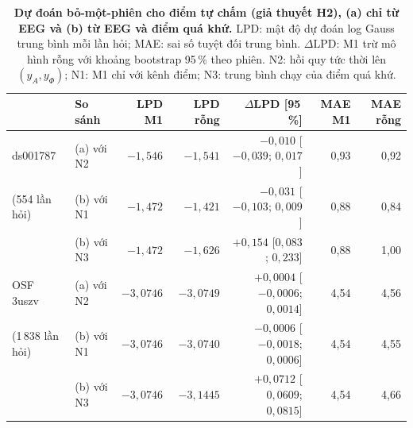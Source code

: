 \begin{table}[t]
\caption{\textbf{Dự đoán bỏ-một-phiên cho điểm tự chấm (giả thuyết H2), (a) chỉ từ EEG và (b) từ EEG và điểm quá khứ.} LPD: mật độ dự đoán log Gauss trung bình mỗi lần hỏi; MAE: sai số tuyệt đối trung bình. \mbox{$\Delta$}LPD: M1 trừ mô hình rỗng với khoảng bootstrap 95\,\% theo phiên. N2: hồi quy tức thời lên $(y_A,y_\Phi)$; N1: M1 chỉ với kênh điểm; N3: trung bình chạy của điểm quá khứ.}
\label{tab:loso}
\centering\footnotesize
\setlength{\tabcolsep}{5pt}
\begin{tabular}{llrrrrr}
\toprule
 & So sánh & LPD M1 & LPD rỗng & $\Delta$LPD [95\,\%] & MAE M1 & MAE rỗng \\
\midrule
ds001787 & (a) với N2 & $-1{,}546$ & $-1{,}541$ & $-0{,}010$ [$-0{,}039$; $0{,}017$] & 0,93 & 0,92 \\
(554 lần hỏi) & (b) với N1 & $-1{,}472$ & $-1{,}421$ & $-0{,}031$ [$-0{,}103$; $0{,}009$] & 0,88 & 0,84 \\
 & (b) với N3 & $-1{,}472$ & $-1{,}626$ & $+0{,}154$ [$0{,}083$; $0{,}233$] & 0,88 & 1,00 \\
\midrule
OSF 3uszv & (a) với N2 & $-3{,}0746$ & $-3{,}0749$ & $+0{,}0004$ [$-0{,}0006$; $0{,}0014$] & 4,54 & 4,56 \\
(1\,838 lần hỏi) & (b) với N1 & $-3{,}0746$ & $-3{,}0740$ & $-0{,}0006$ [$-0{,}0018$; $0{,}0006$] & 4,54 & 4,55 \\
 & (b) với N3 & $-3{,}0746$ & $-3{,}1445$ & $+0{,}0712$ [$0{,}0609$; $0{,}0815$] & 4,54 & 4,66 \\
\bottomrule
\end{tabular}
\end{table}

